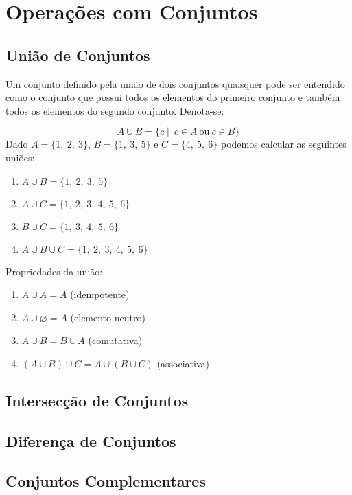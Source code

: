 \documentclass[]{book}
\begin{document}
\section{Operações com Conjuntos}\label{operacoes-com-conjuntos}

\subsection{União de Conjuntos}\label{uniao-de-conjuntos}

Um conjunto definido pela união de dois conjuntos quaisquer pode ser
entendido como o conjunto que possui todos os elementos do primeiro
conjunto e também todos os elementos do segundo conjunto. Denota-se:

\[A \cup B = \{c \mid \ c \in A \ \text{ou} \ c \in B \}\] Dado
\(A = \{ 1,\ 2,\ 3 \}\), \(B = \{ 1,\ 3,\ 5 \}\) e
\(C = \{ 4,\ 5,\ 6 \}\) podemos calcular as seguintes uniões:

\begin{enumerate}
\def\labelenumi{\arabic{enumi}.}
\item
  \(A \cup B = \{ 1,\ 2,\ 3,\ 5 \}\)
\item
  \(A \cup C = \{ 1,\ 2,\ 3,\ 4,\ 5,\ 6 \}\)
\item
  \(B \cup C = \{ 1,\ 3,\ 4,\ 5,\ 6 \}\)
\item
  \(A \cup B \cup C = \{ 1,\ 2,\ 3,\ 4,\ 5,\ 6 \}\)
\end{enumerate}

Propriedades da união:

\begin{enumerate}
\def\labelenumi{\roman{enumi}.}
\item
  \(A \cup A = A\) (idempotente)
\item
  \(A \cup \varnothing = A\) (elemento neutro)
\item
  \(A \cup B = B \cup A\) (comutativa)
\item
  \((A \cup B) \cup C = A \cup (B \cup C)\) (associativa)
\end{enumerate}

\subsection{Intersecção de Conjuntos}\label{interseccao-de-conjuntos}

\subsection{Diferença de Conjuntos}\label{diferenca-de-conjuntos}

\subsection{Conjuntos Complementares}\label{conjuntos-complementares}


\end{document}
